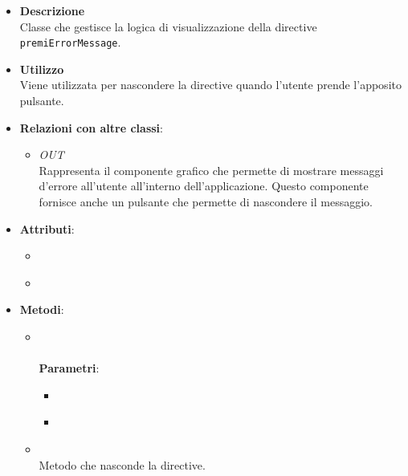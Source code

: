 \begin{itemize}
\item \textbf{Descrizione}\\
Classe che gestisce la logica di visualizzazione della directive \texttt{premiErrorMessage}.
\item \textbf{Utilizzo}\\
Viene utilizzata per nascondere la directive quando l'utente prende l'apposito pulsante.
\item \textbf{Relazioni con altre classi}:
\begin{itemize}
\item \textit{OUT} \hyperref[\nogloxy{Premi::Front-End::Directives::premiErrorMessage}]{}\\
Rappresenta il componente grafico che permette di mostrare messaggi d’errore all’utente all’interno dell’applicazione. Questo componente fornisce anche un pulsante che permette di nascondere il messaggio.
\end{itemize}
\item \textbf{Attributi}:
\begin{itemize}
\item {}
\\ \dpMDDialogServiceField
\item {}
\\ \dpScopeField
\end{itemize}
\item \textbf{Metodi}:
\begin{itemize}
\item {}
\\ \dpConstructor
\\ \textbf{Parametri}:
\begin{itemize}
\item {}
\\ \dpScopeParam
\item {}
\\ \dpMDDialogServiceParam
\end{itemize}
\item {}
\\ Metodo che nasconde la directive.
\end{itemize}
\end{itemize}
